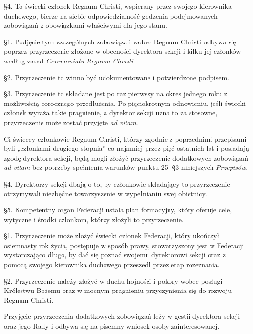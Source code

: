 \S{}4. To świecki członek Regnum Christi, wspierany przez swojego kierownika duchowego, bierze na siebie odpowiedzialność godzenia podejmowanych zobowiązań z obowiązkami właściwymi dla jego stanu.

 \S{}1. Podjęcie tych szczególnych zobowiązań wobec Regnum Christi odbywa się poprzez przyrzeczenie złożone w obecności dyrektora sekcji i kilku jej członków według zasad {\em Ceremoniału Regnum Christi}.

\S{}2. Przyrzeczenie to winno być udokumentowane i potwierdzone podpisem.

\S{}3. Przyrzeczenie to składane jest po raz pierwszy na okres jednego roku z możliwością corocznego przedłużenia. Po pięciokrotnym odnowieniu, jeśli świecki członek wyraża takie pragnienie, a dyrektor sekcji uzna to za stosowne, przyrzeczenie może zostać przyjęte {\em ad vitam}.


Ci świeccy członkowie Regnum Christi, którzy zgodnie z poprzednimi przepisami byli „członkami drugiego stopnia” co najmniej przez pięć ostatnich lat i posiadają zgodę dyrektora sekcji, będą mogli złożyć przyrzeczenie dodatkowych zobowiązań {\em ad vitam} bez potrzeby spełnienia warunków punktu 25, \S{}3 niniejszych {\em Przepisów}.

\S{}4. Dyrektorzy sekcji dbają o to, by członkowie składający to przyrzeczenie otrzymywali niezbędne towarzyszenie w wypełnianiu swej obietnicy.

\S{}5. Kompetentny organ Federacji ustala plan formacyjny, który oferuje cele, wytyczne i środki członkom, którzy złożyli to przyrzeczenie.


 \S{}1. Przyrzeczenie może złożyć świecki członek Federacji, który ukończył osiemnasty rok życia, postępuje w sposób prawy, stowarzyszony jest w Federacji wystarczająco długo, by dać się poznać swojemu dyrektorowi sekcji oraz z pomocą swojego kierownika duchowego przeszedł przez etap rozeznania.

\S{}2. Przyrzeczenie należy złożyć w duchu hojności i pokory wobec posługi Królestwu Bożemu oraz w mocnym pragnieniu przyczynienia się do rozwoju Regnum Christi.


 Przyjęcie przyrzeczenia dodatkowych zobowiązań leży w gestii dyrektora sekcji oraz jego Rady i odbywa się na pisemny wniosek osoby zainteresowanej.


